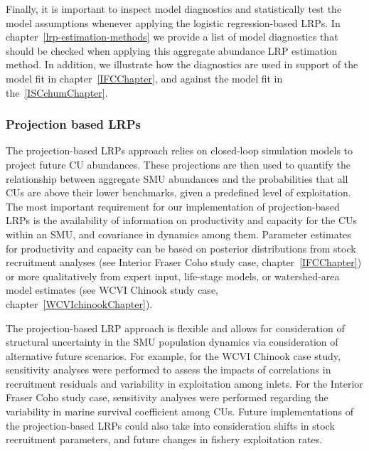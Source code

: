 \documentclass[11pt]{book}
\begin{document}
Finally, it is important to inspect model diagnostics and statistically test the model assumptions whenever applying the logistic regression-based LRPs. In chapter~\ref{lrp-estimation-methods} we provide a list of model diagnostics that should be checked when applying this aggregate abundance LRP estimation method. In addition, we illustrate how the diagnostics are used in support of the model fit in chapter~\ref{IFCChapter}, and against the model fit in the~\ref{ISCchumChapter}.

\hypertarget{projection-based-lrps}{%
\subsubsection{Projection based LRPs}\label{projection-based-lrps}}

The projection-based LRPs approach relies on closed-loop simulation models to project future CU abundances. These projections are then used to quantify the relationship between aggregate SMU abundances and the probabilities that all CUs are above their lower benchmarks, given a predefined level of exploitation. The most important requirement for our implementation of projection-based LRPs is the availability of information on productivity and capacity for the CUs within an SMU, and covariance in dynamics among them. Parameter estimates for productivity and capacity can be based on posterior distributions from stock recruitment analyses (see Interior Fraser Coho study case, chapter~\ref{IFCChapter}) or more qualitatively from expert input, life-stage models, or watershed-area model estimates (see WCVI Chinook study case, chapter~\ref{WCVIchinookChapter}).

The projection-based LRP approach is flexible and allows for consideration of structural uncertainty in the SMU population dynamics via consideration of alternative future scenarios. For example, for the WCVI Chinook case study, sensitivity analyses were performed to assess the impacts of correlations in recruitment residuals and variability in exploitation among inlets. For the Interior Fraser Coho study case, sensitivity analyses were performed regarding the variability in marine survival coefficient among CUs. Future implementations of the projection-based LRPs could also take into consideration shifts in stock recruitment parameters, and future changes in fishery exploitation rates.
\end{document}

